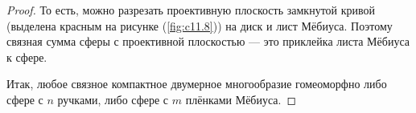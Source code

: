 \begin{proof}
    То есть, можно разрезать проективную плоскость замкнутой кривой (выделена красным на рисунке (\ref{fig:c11.8})) на диск и лист Мёбиуса. Поэтому связная сумма сферы с проективной плоскостью — это приклейка листа Мёбиуса к сфере.

    Итак, любое связное компактное двумерное многообразие гомеоморфно либо сфере с $n$ ручками, либо сфере с $m$ плёнками Мёбиуса.
\end{proof} 